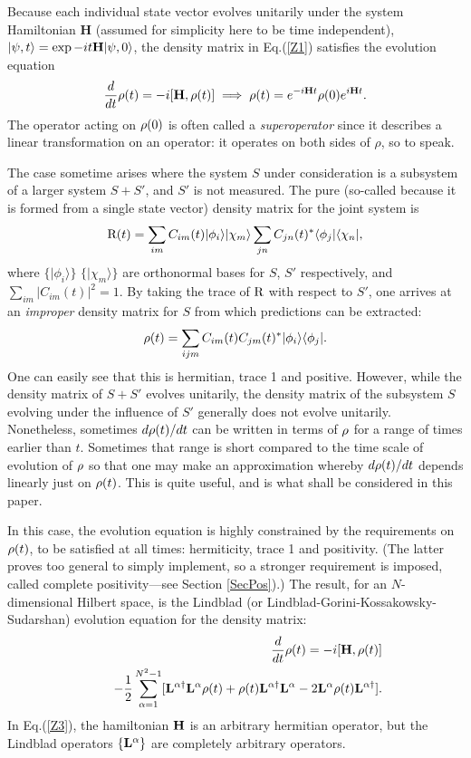\documentclass[aps,pra,twocolumn,amssymb, amsfonts,amsmath,showpacs, superscriptaddress]{revtex4}
\begin{document}
Because each individual state vector evolves unitarily under the system Hamiltonian {\bf H} (assumed for simplicity here to be time independent), $|\psi,t\rangle=\exp-i t{\bf H}|\psi,0\rangle$, the density matrix in Eq.(\ref{Z1}) satisfies the evolution equation 
\begin{equation}\label{Z2}
\frac{d}{dt}{\bf\rho}(t)=-i[{\bf H}, {\bf\rho}(t)]\implies{\bf\rho}(t)=e^{-i{\bf H}t}{\bf\rho}(0)e^{i{\bf H}t}.  
\end{equation}
\noindent  The operator acting on ${\bf\rho}(0)$ is often called a \textit{superoperator}\cite{Prig} since it describes a linear transformation on an operator:  it operates on both sides of $\rho$, so to speak.  

The case sometime arises where the system $S$ under consideration is a subsystem of a larger system $S+S'$, and  $S'$  is not measured. The pure (so-called because it is formed from a single state vector) density matrix for the joint system is
\[
\hbox{{\cal R}} (t)=\sum_{im}C_{im}(t)|\phi_{i}\rangle|\chi_{m}\rangle
\sum_{jn}C_{jn}(t)^{*}\langle\phi_{j}|\langle\chi_{n}|,
\]
\noindent where $\{|\phi_{i}\rangle\}$ $\{|\chi_{m}\rangle\}$ are orthonormal bases for $S$, $S'$ respectively, and $\sum_{im}|C_{im}(t)|^{2}=1$.
By taking the trace of $\hbox{{\cal R}}$ with respect to  $S'$, one arrives at an \textit{improper}\cite{dEspagnat} density matrix for $S$ from which predictions can be extracted:
\[
{\bf \rho} (t)=\sum_{ijm}C_{im}(t)C_{jm}(t)^{*}|\phi_{i}\rangle
\langle\phi_{j}|.
\]
One can easily see that this is hermitian, trace 1 and positive.  However, while the density matrix of $S+S'$ evolves unitarily, the density matrix of the subsystem $S$ evolving under the influence of  $S'$ generally does not evolve unitarily.  Nonetheless,  sometimes $d{\bf\rho}(t)/dt$ can be written in terms of ${\bf\rho}$ for a range of times earlier than $t$.  Sometimes that range is short compared to the time scale of evolution of  ${\bf\rho}$ so that one may make an approximation  whereby $d{\bf\rho}(t)/dt$ depends linearly just on ${\bf\rho}(t)$. This is quite useful, and is what shall be considered in this paper. 

In this case, the evolution equation is highly constrained by the requirements on ${\bf\rho}(t)$, to be satisfied at all times:  hermiticity, trace 1 and positivity. (The latter proves too general to simply implement, so a stronger requirement  is imposed, called complete positivity---see Section \ref{SecPos}).)  The result, for an $N$-dimensional Hilbert space, is the Lindblad\cite{Lind}  (or Lindblad-Gorini-Kossakowsky-Sudarshan\cite{Sud}) evolution equation for the density matrix:
\begin{eqnarray}\label{Z3}
&&\frac{d}{dt}{\bf\rho}(t)=-i[{\bf H},{\bf\rho}(t)]\nonumber\\
&&\quad-\frac{1}{2}\sum_{\alpha=1}^{N^{2}-1}[{\bf L}^{\alpha\dagger}{\bf L}^{\alpha}{\bf\rho}(t)
+{\bf\rho}(t){\bf L}^{\alpha\dagger}{\bf L}^{\alpha}-2{\bf L}^{\alpha}{\bf\rho}(t){\bf L}^{\alpha\dagger}].
\nonumber\\
\end{eqnarray}
In Eq.(\ref{Z3}), the hamiltonian ${\bf H}$ is an arbitrary hermitian operator, but the Lindblad operators $\{{\bf L}^{\alpha}\}$ are completely arbitrary operators.  
\end{document}
